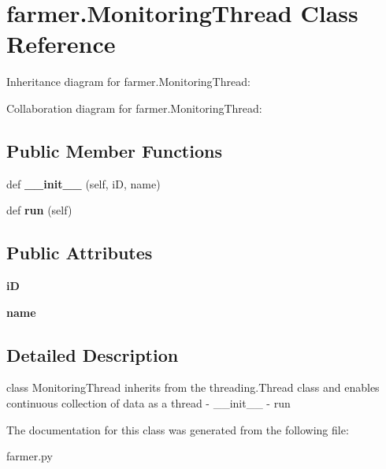 \hypertarget{classfarmer_1_1MonitoringThread}{}\section{farmer.\+Monitoring\+Thread Class Reference}
\label{classfarmer_1_1MonitoringThread}


Inheritance diagram for farmer.\+Monitoring\+Thread\+:


Collaboration diagram for farmer.\+Monitoring\+Thread\+:
\subsection*{Public Member Functions}
\begin{DoxyCompactItemize}
\item 
\mbox{\label{classfarmer_1_1MonitoringThread_af78918ccc693507f0f95f80f4dba3be8}} 
def {\bfseries \+\_\+\+\_\+init\+\_\+\+\_\+} (self, iD, name)
\item 
\mbox{\label{classfarmer_1_1MonitoringThread_ab543b720f6a39c43916e0e0987ec4b6e}} 
def {\bfseries run} (self)
\end{DoxyCompactItemize}
\subsection*{Public Attributes}
\begin{DoxyCompactItemize}
\item 
\mbox{\label{classfarmer_1_1MonitoringThread_a874dcd7e7656c35f2211cfd6183f821b}} 
{\bfseries iD}
\item 
\mbox{\label{classfarmer_1_1MonitoringThread_a57e0c8eb50e39666aa2566771aca2241}} 
{\bfseries name}
\end{DoxyCompactItemize}


\subsection{Detailed Description}
\begin{DoxyVerb}class MonitoringThread inherits from the threading.Thread class and enables continuous collection of data as a thread
    - __init__
    - run
\end{DoxyVerb}
 

The documentation for this class was generated from the following file\+:\begin{DoxyCompactItemize}
\item 
farmer.\+py\end{DoxyCompactItemize}
